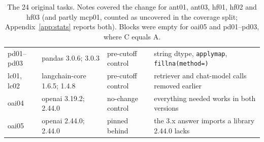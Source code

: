 \documentclass[11pt]{article}
\newcommand{\code}[1]{\texttt{#1}}
\begin{document}
\begin{table}[t]
\begin{tabular}{lll>{\raggedright\arraybackslash}p{6.0cm}}
\midrule
pd01--pd03 & pandas 3.0.6; 3.0.3 & pre-cutoff control & string dtype, \code{applymap}, \code{fillna(method=)} \\
lc01, lc02 & langchain-core 1.6.5; 1.4.8 & pre-cutoff control & retriever and chat-model calls removed earlier \\
oai04 & openai 3.19.2; 2.44.0 & no-change control & everything needed works in both versions \\
oai05 & openai 2.44.0; 2.44.0 & pinned behind & the 3.x answer imports a library 2.44.0 lacks \\
\bottomrule
\end{tabular}
\caption{The 24 original tasks. Notes covered the change for ant01, ant03, hf01, hf02 and hf03 (and partly mcp01, counted as uncovered in the coverage split; Appendix~\ref{app:stats} reports both). Blocks were empty for oai05 and pd01--pd03, where C equals A.}
\label{tab:tasks}

\vspace{8pt}


\end{table}
\end{document}
